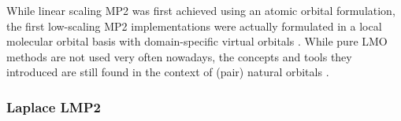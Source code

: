 While linear scaling MP2 was first achieved using an atomic orbital formulation, the first low-scaling MP2 implementations were actually formulated in a local molecular orbital basis with domain-specific virtual orbitals \cite{Pul1983,Sae1985,Pul1986,Sae1987,Sae1988}. While pure LMO methods are not used very often nowadays, the concepts and tools they introduced are still found in the context of (pair) natural orbitals \cite{Pin2018}.


\subsubsection{Laplace LMP2}

